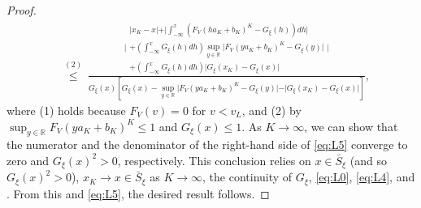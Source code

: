 \begin{proof}
\begin{align}
&\overset{(2)}{\leq}~\tfrac{\Bigg\vert 
\begin{array}{c}
 \vert x_{K}-x\vert +\vert \int_{-\infty }^{x}( {F_{V}(ha_{K}+b_{K})^{K}}-G_{\xi }(h) ) dh\vert  \\ 
+( \int_{-\infty }^{x}G_{\xi }(h) dh) \sup_{y\in \mathbb{R}}\vert F_{V}( ya_{K}+b_{K}) ^{K}-G_{\xi }( y)\vert  \\ 
+( \int_{-\infty }^{x}G_{\xi }(h) dh) \vert G_{\xi }( x_{K})-G_{\xi }( x) \vert 
\end{array}
\Bigg\vert }{
G_{\xi }( x)[ G_{\xi }( x)-\sup_{y\in \mathbb{R}}\vert F_{V}( ya_{K}+b_{K}) ^{K}-G_{\xi }( y)\vert -\vert G_{\xi }( x_{K}) -G_{\xi }( x)\vert] },\label{eq:L5}
\end{align}
where (1) holds because $F_V(v)=0$ for $v<v_L$, 
and (2) by $\sup_{y\in \mathbb{R} }{F_{V}(ya_{K}+b_{K})^{K}\leq 1}$ and $G_{\xi }( x) \leq 1$. As $K\to \infty$, we can show that the numerator and the denominator of the right-hand side of \eqref{eq:L5} converge to zero and $G_{\xi }( x)^2 >0$, respectively. This conclusion relies on $x \in \bar{S}_{\xi}$ (and so $G_{\xi }( x)^2 >0$), $x_{K}\to x\in \bar{S}_{\xi}$ as $K\to \infty$, the continuity of $G_{\xi }$, \eqref{eq:L0}, \eqref{eq:L4}, and \citet[Lemma 2.11]{vandervaart:1998}. %
From this and \eqref{eq:L5}, the desired result follows.
\end{proof}

